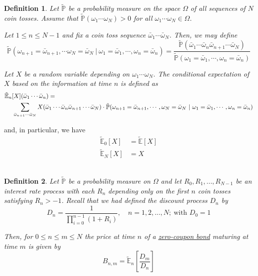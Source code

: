 \documentclass[12pt]{article}
\newtheorem{definition}{Definition}
\newlength\tindent
\renewcommand{\indent}{\hspace*{\tindent}}
\renewcommand{\P}{\mathbb P}
\newcommand{\E}{\mathbb E}
\begin{document}
\begin{definition} Let $\tilde{\P}$ be a probability measure on the space $\Omega$ of all sequences of $N$ coin tosses. Assume that $\tilde{\P}(\omega_1\cdots\omega_N) > 0$ for all $\omega_1\cdots\omega_N \in \Omega$.

Let $1 \leq n \leq N - 1$ and fix a coin toss sequence $\bar{\omega}_1 \cdots \bar{\omega}_N$. Then, we may define
\begin{equation*}
	\tilde{\P}( \omega_{n + 1} = \bar{\omega}_{n + 1},\cdots \omega_N = \bar{\omega}_N ~|~ \omega_1 = \bar{\omega}_1,\cdots,\omega_n = \bar{\omega}_n) = \frac{ \tilde{\P}(\bar{\omega}_1 \cdots \bar{\omega}_n\bar{\omega}_{n + 1} \cdots \bar{\omega}_N) }{ \tilde{\P}(\omega_1 = \bar{\omega}_1, \cdots, \omega_n = \bar{\omega}_n) }
\end{equation*}

Let $X$ be a random variable depending on $\omega_1\cdots\omega_N$. The conditional expectation of $X$ based on the information at time $n$ is defined as
\begin{align*}
	&\tilde{\E}_n[X](\bar{\omega}_1\cdots\bar{\omega}_n) = \\
	&\hphantom{{}={}} \sum_{\bar{\omega}_{n + 1}\cdots\bar{\omega}_N} X(\bar{\omega}_1\cdots\bar{\omega}_n\bar{\omega}_{n + 1}\cdots \bar{\omega}_N) \cdot \tilde{\P}(\omega_{n + 1} = \bar{\omega}_{n + 1}, \cdots, \omega_N = \bar{\omega}_N ~|~ \omega_1 = \bar{\omega}_1, \cdots, \omega_n = \bar{\omega}_n)
\end{align*}
\end{definition}

and, in particular, we have
\begin{align*}
	\tilde{\E}_0[X] &= \tilde{\E}[X] \\
	\tilde{\E}_N[X] &= X
\end{align*} \\

\begin{definition} Let $\tilde{\P}$ be a probability measure on $\Omega$ and let $R_0,R_1,...,R_{N - 1}$ be an interest rate process with each $R_n$ depending only on the first $n$ coin tosses satisfying $R_n > -1$. Recall that we had defined the discount process $D_n$ by
\begin{equation*}
	D_n = \frac{1}{\prod^{n - 1}_{i = 0} (1 + R_i) }, \quad n = 1,2,...,N;~ \text{with } D_0 = 1
\end{equation*}

\indent Then, for $0 \leq n \leq m \leq N$ the price at time $n$ of a \underline{zero-coupon bond} maturing at time $m$ is given by
\begin{equation*}
	B_{n,m} = \tilde{\E}_n \left[ \frac{D_m}{D_n} \right]
\end{equation*}
\end{definition}
\end{document}
